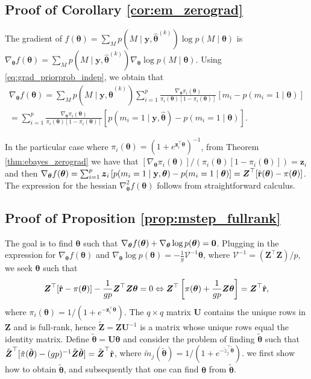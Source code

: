 \documentclass[
  12pt]{article}
\newcommand{\by}{\mathbf{y}}
\newcommand{\bz}{\boldsymbol{z}}
\newcommand{\btheta}{\boldsymbol{\theta}}
\newcommand{\bU}{\mathbf{U}}
\newcommand{\bV}{\mathcal{V}}
\newcommand{\bZ}{\boldsymbol{Z}}
\begin{document}
\subsection{Proof of Corollary \ref{cor:em_zerograd}}
\label{sec:proof_em_zerograd}

The gradient of 
$f(\btheta)= \sum_{M} p(M \mid \by, \hat{\btheta}^{(k)}) \log p(M \mid \btheta)$
is 
$\nabla_{\btheta} f(\btheta)= \sum_{M} p(M \mid \by, \hat{\btheta}^{(k)}) \nabla_{\btheta} \log p(M \mid \btheta)$.
Using \eqref{eq:grad_priorprob_indep}, we obtain that
\begin{align}
 \nabla_{\btheta} f(\btheta)= \sum_{M} p(M \mid \by, \hat{\btheta}^{(k)})
\sum_{i=1}^p \frac{\nabla_{\btheta} \pi_i(\btheta)}{\pi_i(\btheta) [1 - \pi_i(\btheta)]} \left[ m_i - p(m_i=1 \mid \btheta) \right]
\nonumber \\
= \sum_{i=1}^p \frac{\nabla_{\btheta} \pi_i(\btheta)}{\pi_i(\btheta) [1 - \pi_i(\btheta)]} \left[ p(m_i=1 \mid \by, \hat{\btheta}) - p(m_i=1 \mid \btheta) \right].
\nonumber
\end{align}

In the particular case where $\pi_i(\btheta)= (1 + e^{\bz_i^{\top} \btheta})^{-1}$, from Theorem \ref{thm:ebayes_zerograd} we have that
$[\nabla_{\btheta} \pi_i(\btheta)]/(\pi_i(\btheta) [1 - \pi_i(\btheta)])= \bz_i$
and then 
$\nabla_{\btheta} f(\btheta)= \sum_{i=1}^p \bz_i \left[ p(m_i=1 \mid \by, \btheta) - p(m_i=1 \mid \btheta) \right]= \bZ^{\top} [\hat{\mathbf{r}}(\btheta) - {\bf \pi}(\btheta)]$.
The expression for the hessian $\nabla_{\btheta}^2 f(\btheta)$ follows from straightforward calculus.

\subsection{Proof of Proposition \ref{prop:mstep_fullrank}}
\label{sec:proof_mstep_fullrank}


The goal is to find $\btheta$ such that $\nabla_{\btheta} f(\btheta) + \nabla_{\btheta} \log p(\btheta)= {\bf 0}$.
Plugging in the expression for $\nabla_{\btheta} f(\btheta)$ and $\nabla_{\btheta} \log p(\btheta)= -\frac{1}{g} \bV^{-1} \btheta$,
where $\bV^{-1}= (\bZ^{\top} \bZ)/p$, we seek $\btheta$ such that
\begin{align}
\bZ^{\top} [ \hat{\mathbf{r}} - {\bf \pi}(\btheta) ] - \frac{1}{gp} \bZ^{\top} \bZ \btheta=0
\Leftrightarrow
\bZ^{\top} \left[ {\bf \pi}(\btheta) + \frac{1}{gp} \bZ \btheta \right]= \bZ^{\top} \hat{\mathbf{r}}, 
\nonumber
\end{align}
where $\pi_i(\btheta)= 1/(1 + e^{- \bz_i^{\top} \btheta})$.
The $q \times q$ matrix $\bU$ contains the unique rows in $\bZ$ and is full-rank, hence $\tilde{\bZ}= \bZ \bU^{-1}$ is a matrix whose unique rows equal the identity matrix. 
Define $\tilde{\btheta}= \bU \btheta$ and consider the problem of finding $\tilde{\btheta}$ such that $\tilde{\bZ}^{\top} [\tilde{{\bf \pi}}(\tilde{\btheta}) - (gp)^{-1} \tilde{\bZ} \tilde{\btheta}]= \tilde{\bZ}^{\top} \hat{\mathbf{r}}$, where $\tilde{m}_j(\tilde{\btheta})= 1/(1+ e^{- \tilde{z}_j^{\top} \tilde{\btheta}})$. 
we first show how to obtain $\tilde{\btheta}$, and subsequently that one can find $\btheta$ from $\tilde{\btheta}$.
\end{document}
